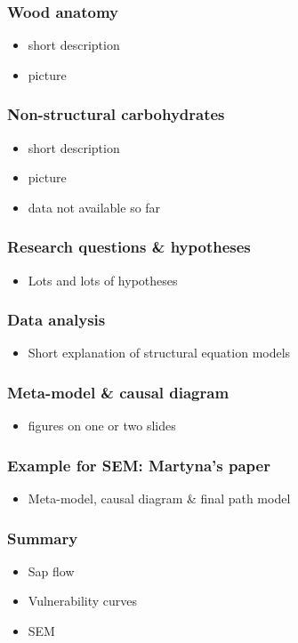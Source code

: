 \documentclass[usepdftitle=false]{beamer}
\begin{document}
\begin{frame}
	\frametitle{Wood anatomy}
	\begin{itemize}
		\item short description
		\item picture
	\end{itemize}
\end{frame}

\begin{frame}
	\frametitle{Non-structural carbohydrates}
	\begin{itemize}
		\item short description
		\item picture
		\item data not available so far
	\end{itemize}
\end{frame}

\begin{frame}
	\frametitle{Research questions \& hypotheses}
	\begin{itemize}
		\item Lots and lots of hypotheses
	\end{itemize}
\end{frame}

\begin{frame}
	\frametitle{Data analysis}
	\begin{itemize}
		\item Short explanation of structural equation models		
	\end{itemize}
\end{frame}

\begin{frame}
	\frametitle{Meta-model \& causal diagram}
	\begin{itemize}
		\item figures on one or two slides		
	\end{itemize}
\end{frame}

\begin{frame}
	\frametitle{Example for SEM: Martyna's paper}
	\begin{itemize}
		\item Meta-model, causal diagram \& final path model	
	\end{itemize}
\end{frame}

\begin{frame}
	\frametitle{Summary}
	\begin{itemize}
		\item Sap flow
		\item Vulnerability curves
		\item SEM
	\end{itemize}
\end{frame}
\end{document}
